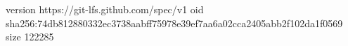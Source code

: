 version https://git-lfs.github.com/spec/v1
oid sha256:74db812880332ec3738aabff75978e39ef7aa6a02cca2405abb2f102da1f0569
size 122285
